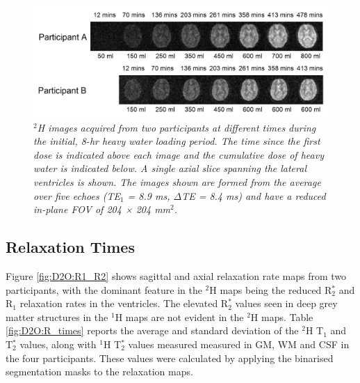 \begin{figure}[H]
    \centering
    \includegraphics[width=1\textwidth]{Figures/D2O/Loading.png}
    \caption{\textit{$^2$H images acquired from two participants at different times during the initial, 8-hr heavy water loading period. The time since the first dose is indicated above each image and the cumulative dose of heavy water is indicated below. A single axial slice spanning the lateral ventricles is shown. The images shown are formed from the average over five echoes (TE$_1$ = 8.9 ms, $\Delta$TE = 8.4 ms) and have a reduced in-plane \ac{FOV} of 204 × 204 mm$^2$.}}
    \label{fig:D2O:Load}
\end{figure}

\subsection{Relaxation Times}

Figure \ref{fig:D2O:R1_R2} shows sagittal and axial relaxation rate maps from two participants, with the dominant feature in the $^2$H maps being the reduced R$_2^*$ and R$_1$ relaxation rates in the ventricles. The elevated R$_2^*$ values seen in deep grey matter structures in the $^1$H maps are not evident in the $^2$H maps. Table \ref{fig:D2O:R_times} reports the average and standard deviation of the $^2$H T$_1$ and T$_2^*$ values, along with $^1$H T$_2^*$ values measured measured in \ac{GM}, \ac{WM} and \ac{CSF} in the four participants. These values were calculated by applying the binarised segmentation masks to the relaxation maps.

